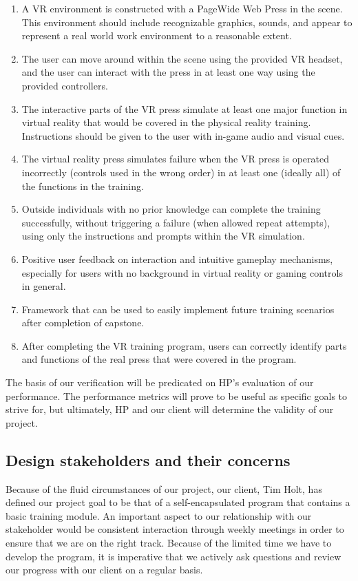 \documentclass[onecolumn, draftclsnofoot,10pt, compsoc]{IEEEtran}
\begin{document}
\begin{enumerate}
\item A VR environment is constructed with a PageWide Web Press in the scene. This environment should include recognizable graphics, sounds, and appear to represent a real world work environment to a reasonable extent.

\item The user can move around within the scene using the provided VR headset, and the user can interact with the press in at least one way using the provided controllers. 

\item The interactive parts of the VR press simulate at least one major function in virtual reality that would be covered in the physical reality training. Instructions should be given to the user with in-game audio and visual cues.  

\item The virtual reality press simulates failure when the VR press is operated incorrectly (controls used in the wrong order) in at least one (ideally all) of the functions in the training.

\item Outside individuals with no prior knowledge can complete the training successfully, without triggering a failure (when allowed repeat attempts), using only the instructions and prompts within the VR simulation. 

\item Positive user feedback on interaction and intuitive gameplay mechanisms, especially for users with no background in virtual reality or gaming controls in general.

\item Framework that can be used to easily implement future training scenarios after completion of capstone.

\item After completing the VR training program, users can correctly identify parts and functions of the real press that were covered in the program.
\end{enumerate}

The basis of our verification will be predicated on HP's evaluation of our performance. The performance metrics will prove to be useful as specific goals to strive for, but ultimately, HP and our client will determine the validity of our project. 

\subsection{Design stakeholders and their concerns}
Because of the fluid circumstances of our project, our client, Tim Holt, has defined our project goal to be that of a self-encapsulated program that contains a basic training module. An important aspect to our relationship with our stakeholder would be consistent interaction through weekly meetings in order to ensure that we are on the right track. Because of the limited time we have to develop the program, it is imperative that we actively ask questions and review our progress with our client on a regular basis. 
\end{document}
